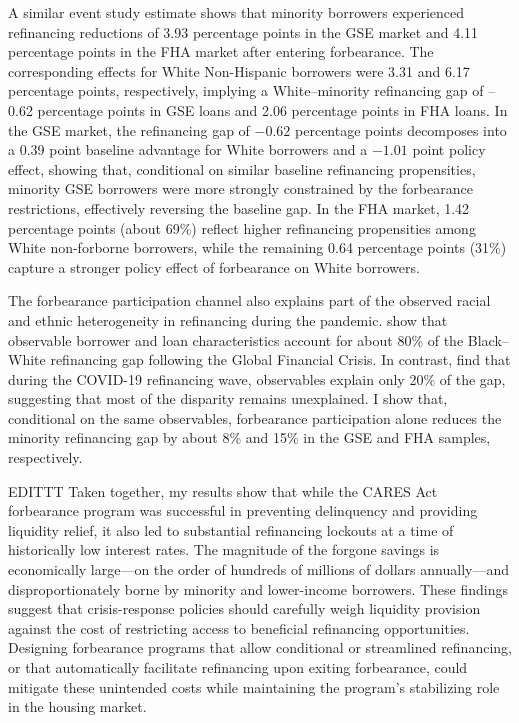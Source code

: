 \documentclass[11pt]{article}
\newcommand{\andreas}[1]{\todo[inline,linecolor=blue, backgroundcolor=yellow!20!white, bordercolor=blue, size=\tiny]{#1}}
\begin{document}
A similar event study estimate shows that minority borrowers experienced refinancing reductions of 3.93 percentage points in the GSE market and 4.11 percentage points in the FHA market after entering forbearance. The corresponding effects for White Non-Hispanic borrowers were 3.31 and 6.17 percentage points, respectively, implying a White–minority refinancing gap of –0.62 percentage points in GSE loans and 2.06 percentage points in FHA loans. In the GSE market, the refinancing gap of $-0.62$ percentage points decomposes into a 0.39 point baseline advantage for White borrowers and a $-1.01$ point policy effect, showing that, conditional on similar baseline refinancing propensities, minority GSE borrowers were more strongly constrained by the forbearance restrictions, effectively reversing the baseline gap. In the FHA market, 1.42 percentage points (about 69\%) reflect higher refinancing propensities among White non-forborne borrowers, while the remaining 0.64 percentage points (31\%) capture a stronger policy effect of forbearance on White borrowers.

The forbearance participation channel also explains part of the observed racial and ethnic heterogeneity in refinancing during the pandemic. \citet{gerardi2023mortgage} show that observable borrower and loan characteristics account for about 80\% of the Black–White refinancing gap following the Global Financial Crisis. In contrast, \citet{gerardi2021racial} find that during the COVID-19 refinancing wave, observables explain only 20\% of the gap, suggesting that most of the disparity remains unexplained. I show that, conditional on the same observables, forbearance participation alone reduces the minority refinancing gap by about 8\% and 15\% in the GSE and FHA samples, respectively.  



EDITTT  Taken together, my results show that while the CARES Act forbearance program was successful in preventing delinquency and providing liquidity relief, it also led to substantial refinancing lockouts at a time of historically low interest rates. The magnitude of the forgone savings is economically large—on the order of hundreds of millions of dollars annually—and disproportionately borne by minority and lower-income borrowers. These findings suggest that crisis-response policies should carefully weigh liquidity provision against the cost of restricting access to beneficial refinancing opportunities. Designing forbearance programs that allow conditional or streamlined refinancing, or that automatically facilitate refinancing upon exiting forbearance, could mitigate these unintended costs while maintaining the program’s stabilizing role in the housing market.
\clearpage
\end{document}
